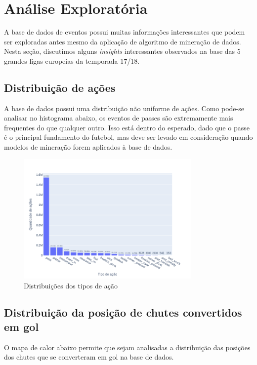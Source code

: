 \documentclass{article}
\begin{document}
\section{Análise Exploratória}

A base de dados de eventos possui muitas informações interessantes que podem
ser exploradas antes mesmo da aplicação
de algoritmo de mineração de dados. Nesta seção, discutimos alguns
\textit{insights} interessantes observados na base das 5 grandes ligas
europeias da temporada 17/18.

\subsection{Distribuição de ações}

A base de dados possui uma distribuição não uniforme de ações. Como pode-se
analisar no histograma abaixo, os eventos de passes são extremamente mais
frequentes do que qualquer outro. Isso está dentro do esperado, dado que o
passe é o principal fundamento do futebol, mas deve ser levado em consideração
quando modelos de mineração forem aplicados à base de dados.

\begin{figure}[H]
	\centering
	\includegraphics[width=0.8\textwidth]{images/action_distribution.png}
	\caption{Distribuições dos tipos de ação}
	\label{fig:action_distribution}
\end{figure}

\subsection{Distribuição da posição de chutes convertidos em gol}

O mapa de calor abaixo permite que sejam analisadas a distribuição das posições
dos chutes que se converteram em gol
na base de dados.
\end{document}
